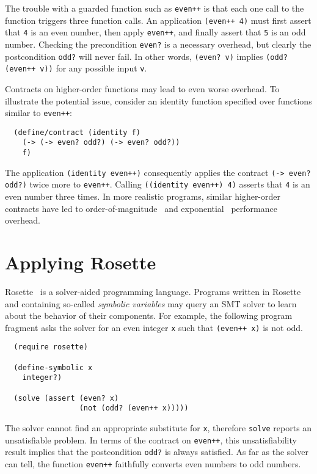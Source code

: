 \documentclass[preprint,9pt]{sigplanconf}
\begin{document}
The trouble with a guarded function such as {\tt even++} is that each one call to the function triggers three function calls.
An application {\tt (even++ 4)} must first assert that {\tt 4} is an even number, then apply {\tt even++}, and finally assert that {\tt 5} is an odd number.
Checking the precondition {\tt even?} is a necessary overhead, but clearly the postcondition {\tt odd?} will never fail.
In other words, {\tt (even? v)} implies {\tt (odd? (even++ v))} for any possible input {\tt v}.

Contracts on higher-order functions may lead to even worse overhead.
To illustrate the potential issue, consider an identity function specified over functions similar to {\tt even++}:

\begin{verbatim}
  (define/contract (identity f)
    (-> (-> even? odd?) (-> even? odd?))
    f)
\end{verbatim}

The application {\tt (identity even++)} consequently applies the contract {\tt (-> even? odd?)} twice more to {\tt even++}.
Calling {\tt ((identity even++) 4)} asserts that {\tt 4} is an even number three times.
In more realistic programs, similar higher-order contracts have led to order-of-magnitude~\cite{tfgnfv-popl-2016} and exponential~\cite{tfdfftf-ecoop-2015} performance overhead.


\section{Applying Rosette}

Rosette~\cite{tb-pldi-2014} is a solver-aided programming language. %
Programs written in Rosette and containing so-called \emph{symbolic variables} may query an SMT solver to learn about the behavior of their components.
For example, the following program fragment asks the solver for an even integer {\tt x} such that {\tt (even++ x)} is not odd.

\begin{verbatim}
  (require rosette)

  (define-symbolic x
    integer?)

  (solve (assert (even? x)
                 (not (odd? (even++ x)))))
\end{verbatim}

\noindent The solver cannot find an appropriate substitute for {\tt x}, therefore {\tt solve} reports an unsatisfiable problem.
In terms of the contract on {\tt even++}, this unsatisfiability result implies that the postcondition {\tt odd?} is always satisfied.
As far as the solver can tell, the function {\tt even++} faithfully converts even numbers to odd numbers.
\end{document}

